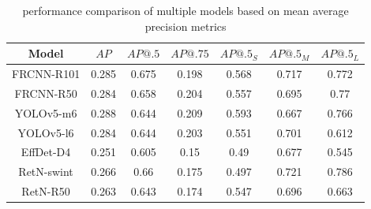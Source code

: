 \begin{table}[H]
    \begin{tabular}{|c|c|c|c|c|c|c|}
        \hline
        Model      & $AP$  & $AP@.5$ & $AP@.75$ & $AP@.5_S$ & $AP@.5_M$ & $AP@.5_L$ \\ \hline
        FRCNN-R101 & 0.285 & 0.675   & 0.198    & 0.568     & 0.717     & 0.772     \\ \hline
        FRCNN-R50  & 0.284 & 0.658   & 0.204    & 0.557     & 0.695     & 0.77      \\ \hline
        YOLOv5-m6  & 0.288 & 0.644   & 0.209    & 0.593     & 0.667     & 0.766     \\ \hline
        YOLOv5-l6  & 0.284 & 0.644   & 0.203    & 0.551     & 0.701     & 0.612     \\ \hline
        EffDet-D4  & 0.251 & 0.605   & 0.15     & 0.49      & 0.677     & 0.545     \\ \hline
        RetN-swint & 0.266 & 0.66    & 0.175    & 0.497     & 0.721     & 0.786     \\ \hline
        RetN-R50   & 0.263 & 0.643   & 0.174    & 0.547     & 0.696     & 0.663     \\ \hline
    \end{tabular}
    \caption{performance comparison of multiple models based on mean average precision metrics}
    \label{tab:model_results:stage_four}
\end{table}

